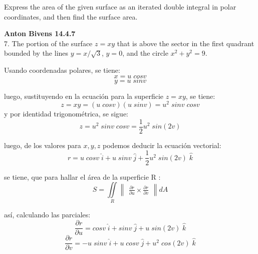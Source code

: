 \documentclass{minimal}
\begin{document}
Express the area of the given surface as an iterated double integral in polar coordinates, and then find the surface area.


\textbf{Anton Bivens 14.4.7}\\

7. The portion of the surface $z = xy$ that is above the sector in the first quadrant bounded by the lines $y = x / \sqrt 3$, $y = 0$, and the circle $x^2 + y^2=9$.

    Usando coordenadas polares, se tiene:
        $$ x = u \; cos v $$
        $$ y = u \; sin v $$

    luego, sustituyendo en la ecuación para la superficie $z = xy$, se tiene:
        $$ z = xy = ( u \; cos v)(u \; sin v ) = u^2 \; sin v \; cos v $$
    y por identidad trigonométrica, se sigue:
        $$ z = u^2 \; sin v \; cos v = \frac{1}{2} u^2 \; sin(2v)$$

    luego, de los valores para $x, y, z$ podemos deducir la ecuación vectorial:
        $$ r = u \; cosv \; \hat{i} + u  \; sin v \; \hat{j} +
               \frac{1}{2} u^2 \; sin(2v) \; \hat{k} $$

    se tiene, que para hallar el área de la superficie R :
        $$ S = \iint\limits_{R} \begin{Vmatrix} \frac{\partial r}{\partial u}
              \times \frac{\partial r}{\partial v}\end{Vmatrix} dA $$

    así, calculando las parciales:
        $$ \frac{\partial r}{\partial u}
                = cosv \; \hat{i} + sin v \; \hat{j} + u \; sin(2v) \; \hat{k}$$
        $$ \frac{\partial r}{\partial v}
                = - u \; sinv \; \hat{i} + u  \; cos v \; \hat{j} +
                  u^2 \; cos(2v) \; \hat{k} $$
\end{document}

